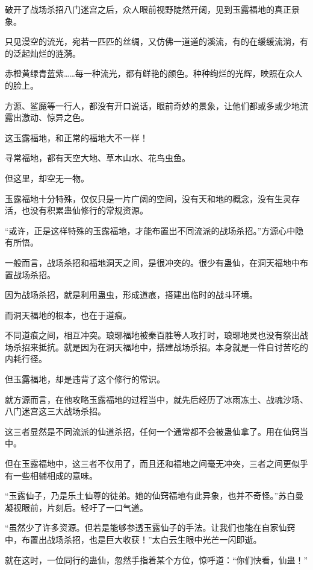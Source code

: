 
\begin{this_body}



破开了战场杀招八门迷宫之后，众人眼前视野陡然开阔，见到玉露福地的真正景象。

只见漫空的流光，宛若一匹匹的丝绸，又仿佛一道道的溪流，有的在缓缓流淌，有的泛起灿烂的涟漪。

赤橙黄绿青蓝紫……每一种流光，都有鲜艳的颜色。种种绚烂的光辉，映照在众人的脸上。

方源、鲨魔等一行人，都没有开口说话，眼前奇妙的景象，让他们都或多或少地流露出激动、惊异之色。

这玉露福地，和正常的福地大不一样！

寻常福地，都有天空大地、草木山水、花鸟虫鱼。

但这里，却空无一物。

玉露福地十分特殊，仅仅只是一片广阔的空间，没有天和地的概念，没有生灵存活，也没有积累蛊仙修行的常规资源。

“或许，正是这样特殊的玉露福地，才能布置出不同流派的战场杀招。”方源心中隐有所悟。

一般而言，战场杀招和福地洞天之间，是很冲突的。很少有蛊仙，在洞天福地中布置战场杀招。

因为战场杀招，就是利用蛊虫，形成道痕，搭建出临时的战斗环境。

而洞天福地的根本，也在于道痕。

不同道痕之间，相互冲突。琅琊福地被秦百胜等人攻打时，琅琊地灵也没有祭出战场杀招来抵抗。就是因为在洞天福地中，搭建战场杀招。本身就是一件自讨苦吃的内耗行径。

但玉露福地，却是违背了这个修行的常识。

就方源而言，在他攻略玉露福地的过程当中，就先后经历了冰雨冻土、战魂沙场、八门迷宫这三大战场杀招。

这三者显然是不同流派的仙道杀招，任何一个通常都不会被蛊仙拿了。用在仙窍当中。

但在玉露福地中，这三者不仅用了，而且还和福地之间毫无冲突，三者之间更似乎有一些相辅相成的意味。

“玉露仙子，乃是乐土仙尊的徒弟。她的仙窍福地有此异象，也并不奇怪。”苏白曼凝视眼前，片刻后。轻吁了一口气道。

“虽然少了许多资源。但若是能够参透玉露仙子的手法。让我们也能在自家仙窍中，布置出战场杀招，也是巨大收获！”太白云生眼中光芒一闪即逝。

就在这时，一位同行的蛊仙，忽然手指着某个方位，惊呼道：“你们快看，仙蛊！”


\end{this_body}
